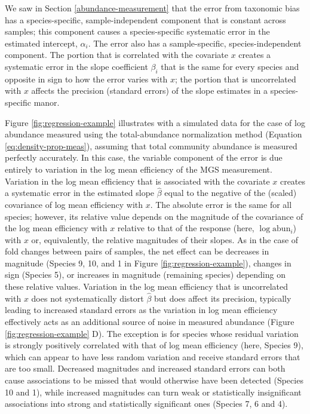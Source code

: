 \documentclass[
]{article}
\begin{document}
We saw in Section \ref{abundance-measurement} that the error from taxonomic bias has a species-specific, sample-independent component that is constant across samples; this component causes a species-specific systematic error in the estimated intercept, \(\alpha_{i}\).
The error also has a sample-specific, species-independent component.
The portion that is correlated with the covariate \(x\) creates a systematic error in the slope coefficient \(\beta_{i}\) that is the same for every species and opposite in sign to how the error varies with \(x\);
the portion that is uncorrelated with \(x\) affects the precision (standard errors) of the slope estimates in a species-specific manor.

Figure \ref{fig:regression-example} illustrates with a simulated data for the case of log abundance measured using the total-abundance normalization method (Equation \eqref{eq:density-prop-meas}), assuming that total community abundance is measured perfectly accurately.
In this case, the variable component of the error is due entirely to variation in the log mean efficiency of the MGS measurement.
Variation in the log mean efficiency that is associated with the covariate \(x\) creates a systematic error in the estimated slope \(\hat \beta\) equal to the negative of the (scaled) covariance of log mean efficiency with \(x\).
The absolute error is the same for all species; however, its relative value depends on the magnitude of the covariance of the log mean efficiency with \(x\) relative to that of the response (here, \(\log \text{abun}_{i}\)) with \(x\) or, equivalently, the relative magnitudes of their slopes.
As in the case of fold changes between pairs of samples, the net effect can be decreases in magnitude (Species 9, 10, and 1 in Figure \ref{fig:regression-example}), changes in sign (Species 5), or increases in magnitude (remaining species) depending on these relative values.
Variation in the log mean efficiency that is uncorrelated with \(x\) does not systematically distort \(\hat \beta\) but does affect its precision, typically leading to increased standard errors as the variation in log mean efficiency effectively acts as an additional source of noise in measured abundance (Figure \ref{fig:regression-example} D).
The exception is for species whose residual variation is strongly positively correlated with that of log mean efficiency (here, Species 9), which can appear to have less random variation and receive standard errors that are too small.
Decreased magnitudes and increased standard errors can both cause associations to be missed that would otherwise have been detected (Species 10 and 1), while increased magnitudes can turn weak or statistically insignificant associations into strong and statistically significant ones (Species 7, 6 and 4).
\end{document}
